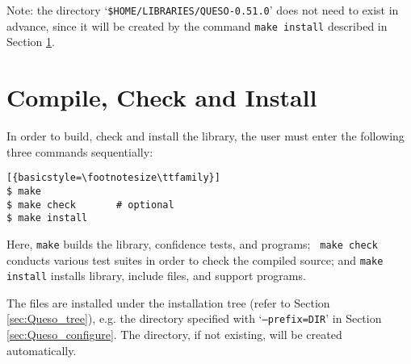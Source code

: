 Note: the directory `\verb+$HOME/LIBRARIES/QUESO-0.51.0+' does not need to exist in advance, since it will be created by the command \verb+make install+ described in Section \ref{sec:install_Queso_make}.


\section{Compile, Check and Install \Queso{}}\label{sec:install_Queso_make}
%
In order to build, check and install the library, the user must enter the following three commands sequentially:
\begin{lstlisting}[{basicstyle=\footnotesize\ttfamily}]
$ make
$ make check       # optional
$ make install 
\end{lstlisting}

Here, \verb+make+ builds the library, confidence tests, and programs;  \verb+ make check+ conducts various test suites in order to check the compiled source; and \verb+make install+ installs \Queso{} library, include files, and support programs.

The files are installed under the installation tree (refer to Section \ref{sec:Queso_tree}), e.g. the directory specified with `\texttt{--prefix=DIR}' in Section \ref{sec:Queso_configure}. The directory, if not existing, will be created automatically.%

% 
% 
% 
% 

